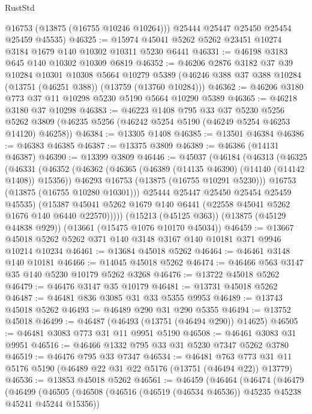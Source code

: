 \begin{lexlean}{RustStd}
\begin{coremodule}
        @16753
        (@13875 (@16755 @10246 @10264)))
      @25444
      @25447
      @25450
      @25454
      @25459
      @45535)
@46325 := @15974 @45041 @5262 @5262 @23451 @10274 @3184 @1679 @140 @10302 @10311 @5230 @6441
@46331 := @46198 @3183 @645 @140 @10302 @10309 @6819
@46352 := @46206
    @2876
    @3182
    @37
    @39
    @10284
    @10301
    @10308
    @5664
    @10279
    @5389
    (@46246 @388 @37 @388 @10284 (@13751 (@46251 @388)) (@13759 (@13760 @10284)))
@46362 := @46206 @3180 @773 @37 @11 @10298 @5230 @5190 @5664 @10290 @5389
@46365 := @46218 @3180 @37 @10298
@46383 := @46223
    @1408
    @795
    @33
    @37
    @5230
    @5256
    @5262
    @3809
    (@46235 @5256 (@46242 @5254 @5190 (@46249 @5254 @46253 @14120) @46258))
@46384 := @13305 @1408
@46385 := @13501 @46384
@46386 := @46383 @46385
@46387 := @13375 @3809
@46389 := @46386 (@14131 @46387)
@46390 := @13399 @3809
@46446 := @45037
    (@46184
      (@46313
        (@46325
          (@46331
            (@46352
              (@46362
                (@46365 (@46389 (@14135 @46390) (@14140 (@14142 @1408)) @15356))
                @46293
                @16753
                (@13875 (@16755 @10291 @5230)))
              @16753
              (@13875 (@16755 @10280 @10301)))
            @25444
            @25447
            @25450
            @25454
            @25459
            @45535)
          (@15387 @45041 @5262 @1679 @140 @6441 (@22558 @45041 @5262 @1676 @140 @6440 @22570)))))
    (@15213 (@45125 @363))
    (@13875 (@45129 @44838 @929))
    (@13661 (@15475 @1076 @10170 @45034))
@46459 := @13667 @45018 @5262 @5262 @371 @140 @3148 @3167 @140 @10181 @371 @9946 @10214 @10234
@46461 := @13684 @45018 @5262
@46464 := @46461 @3148 @140 @10181
@46466 := @14045 @45018 @5262
@46474 := @46466 @563 @3147 @35 @140 @5230 @10179 @5262 @3268
@46476 := @13722 @45018 @5262
@46479 := @46476 @3147 @35 @10179
@46481 := @13731 @45018 @5262
@46487 := @46481 @836 @3085 @31 @33 @5355 @9953
@46489 := @13743 @45018 @5262
@46493 := @46489 @290 @31 @290 @5355
@46494 := @13752 @45018
@46499 := @46487 (@46493 (@13751 (@46494 @290)) @14625)
@46505 := @46481 @3083 @773 @31 @11 @9951 @5190
@46508 := @46461 @3083 @31 @9951
@46516 := @46466 @1332 @795 @33 @31 @5230 @7347 @5262 @3780
@46519 := @46476 @795 @33 @7347
@46534 := @46481
    @763
    @773
    @31
    @11
    @5176
    @5190
    (@46489 @22 @31 @22 @5176 (@13751 (@46494 @22)) @13779)
@46536 := @13853 @45018 @5262
@46561 := @46459
    (@46464
      (@46474
        (@46479
          (@46499
            (@46505
              (@46508 (@46516 (@46519 (@46534 @46536)) @45235 @45238 @45241 @45244 @15356))

\end{coremodule}
\end{lexlean}
